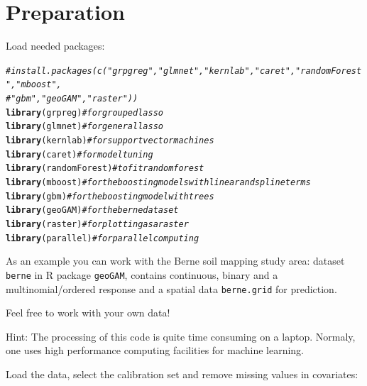 \documentclass[11pt,a4paper,twoside]{article}\usepackage[]{graphicx}\usepackage[]{color}
\makeatletter
\newcommand{\hlcom}[1]{\textcolor[rgb]{0.678,0.584,0.686}{\textit{#1}}}%
\newcommand{\hlstd}[1]{\textcolor[rgb]{0.345,0.345,0.345}{#1}}%
\newcommand{\hlkwd}[1]{\textcolor[rgb]{0.737,0.353,0.396}{\textbf{#1}}}%
\newenvironment{kframe}{%
 \def\at@end@of@kframe{}%
 \ifinner\ifhmode%
  \def\at@end@of@kframe{\end{minipage}}%
  \begin{minipage}{\columnwidth}%
 \fi\fi%
 \def\FrameCommand##1{\hskip\@totalleftmargin \hskip-\fboxsep
 \colorbox{shadecolor}{##1}\hskip-\fboxsep
     \hskip-\linewidth \hskip-\@totalleftmargin \hskip\columnwidth}%
 \MakeFramed {\advance\hsize-\width
   \@totalleftmargin\z@ \linewidth\hsize
   \@setminipage}}%
 {\par\unskip\endMakeFramed%
 \at@end@of@kframe}
\newenvironment{knitrout}{}{} %
\makeatother
\begin{document}






\section*{Preparation}

Load needed packages:

\begin{knitrout}
\color{fgcolor}\begin{kframe}
\begin{alltt}
\hlcom{# install.packages(c("grpgreg", "glmnet", "kernlab", "caret", "randomForest", "mboost",}
\hlcom{#                    "gbm", "geoGAM", "raster"))}
\hlkwd{library}\hlstd{(grpreg)} \hlcom{# for grouped lasso}
\hlkwd{library}\hlstd{(glmnet)} \hlcom{# for general lasso}
\hlkwd{library}\hlstd{(kernlab)} \hlcom{# for support vector machines}
\hlkwd{library}\hlstd{(caret)} \hlcom{# for model tuning}
\hlkwd{library}\hlstd{(randomForest)} \hlcom{# to fit random forest}
\hlkwd{library}\hlstd{(mboost)} \hlcom{# for the boosting models with linear and spline terms  }
\hlkwd{library}\hlstd{(gbm)} \hlcom{# for the boosting model with trees}
\hlkwd{library}\hlstd{(geoGAM)} \hlcom{# for the berne dataset}
\hlkwd{library}\hlstd{(raster)} \hlcom{# for plotting as a raster}
\hlkwd{library}\hlstd{(parallel)} \hlcom{# for parallel computing}
\end{alltt}
\end{kframe}
\end{knitrout}

As an example you can work with the Berne soil mapping study area: dataset \texttt{berne} in R package \texttt{geoGAM}, contains continuous, binary and a multinomial/ordered response and a spatial data \texttt{berne.grid} for prediction. 

Feel free to work with your own data!

Hint: The processing of this code is quite time consuming on a laptop. Normaly, one uses high performance computing facilities for machine learning.  

Load the data, select the calibration set and remove missing values in covariates: 
\end{document}
